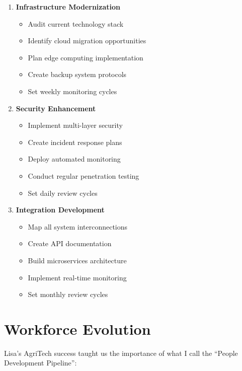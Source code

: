 \begin{tcolorbox}[colback=white,colframe=primarydark,title=\textbf{Technology Implementation Steps}]
\begin{enumerate}
    \item \textbf{Infrastructure Modernization}
    \begin{itemize}
        \item Audit current technology stack
        \item Identify cloud migration opportunities
        \item Plan edge computing implementation
        \item Create backup system protocols
        \item Set weekly monitoring cycles
    \end{itemize}

    \item \textbf{Security Enhancement}
    \begin{itemize}
        \item Implement multi-layer security
        \item Create incident response plans
        \item Deploy automated monitoring
        \item Conduct regular penetration testing
        \item Set daily review cycles
    \end{itemize}

    \item \textbf{Integration Development}
    \begin{itemize}
        \item Map all system interconnections
        \item Create API documentation
        \item Build microservices architecture
        \item Implement real-time monitoring
        \item Set monthly review cycles
    \end{itemize}
\end{enumerate}
\end{tcolorbox}

\section{Workforce Evolution}\label{sec:workforce-evolution}

Lisa's AgriTech success taught us the importance of what I call the ``People Development Pipeline'':

